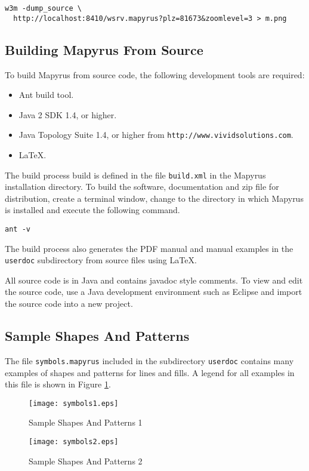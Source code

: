 \begin{verbatim}
w3m -dump_source \
  http://localhost:8410/wsrv.mapyrus?plz=81673&zoomlevel=3 > m.png
\end{verbatim}

\subsection{Building Mapyrus From Source}

To build Mapyrus from source code, the following development tools
are required:

\begin{itemize}
\item
Ant build tool.
\item
Java 2 SDK 1.4, or higher.
\item
Java Topology Suite 1.4, or higher from \texttt{http://www.vividsolutions.com}.
\item
\LaTeX.
\end{itemize}

The build process build is defined in the file \texttt{build.xml} in the
Mapyrus installation directory.  To build the software, documentation and zip
file for distribution, create a terminal window, change to the directory in
which Mapyrus is installed and execute the following command.

\begin{verbatim}
ant -v
\end{verbatim}

The build process also generates the PDF manual and manual examples in the
\texttt{userdoc} subdirectory from source files using \LaTeX.

All source code is in Java and contains javadoc style comments.  To view and
edit the source code, use a Java development environment such as Eclipse and
import the source code into a new project.


\subsection{Sample Shapes And Patterns}
The file \texttt{symbols.mapyrus} included in the subdirectory
\texttt{userdoc} contains many examples of shapes and patterns
for lines and fills.  A legend for all examples in this file is shown
in Figure \ref{samplesymbols}.

\begin{figure}[htb]
\label{samplesymbols}
\texttt{[image: symbols1.eps]}
\caption{Sample Shapes And Patterns 1}
\end{figure}

\begin{figure}[htb]
\texttt{[image: symbols2.eps]}
\caption{Sample Shapes And Patterns 2}
\end{figure}

